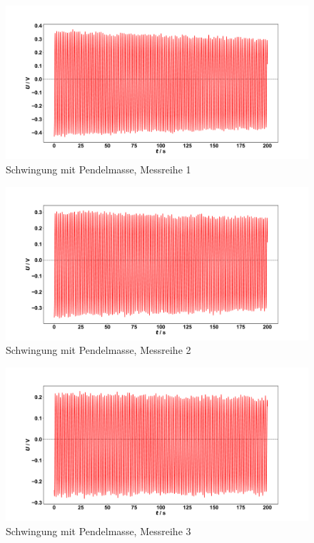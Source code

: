 \begin{figure}[H]
	\centering
	\includegraphics[width=1\textwidth]{Schwingung1_mit.pdf}
	\caption{Schwingung mit Pendelmasse, Messreihe 1}
	\label{fig:Schwingung1_mit}
\end{figure}
\begin{figure}[H]
	\centering
	\includegraphics[width=1\textwidth]{Schwingung2_mit.pdf}
	\caption{Schwingung mit Pendelmasse, Messreihe 2}
	\label{fig:Schwingung2_mit}
\end{figure}
\begin{figure}[H]
	\centering
	\includegraphics[width=1\textwidth]{Schwingung3_mit.pdf}
	\caption{Schwingung mit Pendelmasse, Messreihe 3}
	\label{fig:Schwingung3_mit}
\end{figure}

